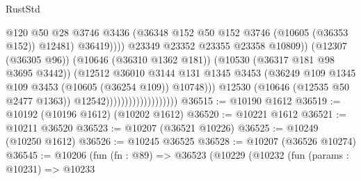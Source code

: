 \begin{lexlean}{RustStd}
\begin{coremodule}
                                                        @120
                                                        @50
                                                        @28
                                                        @3746
                                                        @3436
                                                        (@36348
                                                          @152
                                                          @50
                                                          @152
                                                          @3746
                                                          (@10605 (@36353 @152))
                                                          @12481)
                                                        @36419))))
                                                @23349
                                                @23352
                                                @23355
                                                @23358
                                                @10809))
                                            (@12307 (@36305 @96))
                                            (@10646 (@36310 @1362 @181))
                                            (@10530 (@36317 @181 @98 @3695 @3442))
                                            (@12512
                                              @36010
                                              @3144
                                              @131
                                              @1345
                                              @3453
                                              (@36249
                                                @109
                                                @1345
                                                @109
                                                @3453
                                                (@10605 (@36254 @109))
                                                @10748)))
                                          @12530
                                          (@10646 (@12535 @50 @2477 @1363))
                                          @12542)))))))))))))))))))
@36515 := @10190 @1612
@36519 := @10192 (@10196 @1612) (@10202 @1612)
@36520 := @10221 @1612
@36521 := @10211 @36520
@36523 := @10207 (@36521 @10226)
@36525 := @10249 (@10250 @1612)
@36526 := @10245 @36525
@36528 := @10207 (@36526 @10274)
@36545 := @10206
    (fun (fn : @89) =>
    @36523
      (@10229
        (@10232
          (fun (params : @10231) =>
          @10233

\end{coremodule}
\end{lexlean}
